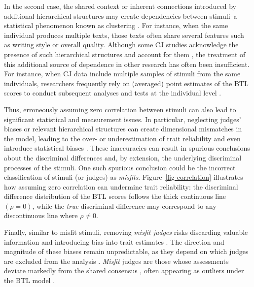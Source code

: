 \documentclass[
  authoryear,
  review,
  1p]{elsarticle}
\begin{document}
In the second case, the shared context or inherent connections
introduced by additional hierarchical structures may create dependencies
between stimuli--a statistical phenomenon known as clustering
\citep{Everitt_et_al_2010}. For instance, when the same individual
produces multiple texts, those texts often share several features such
as writing style or overall quality. Although some CJ studies
acknowledge the presence of such hierarchical structures and account for
them \citep[e.g.,][]{Boonen_et_al_2020}, the treatment of this
additional source of dependence in other research has often been
insufficient. For instance, when CJ data include multiple samples of
stimuli from the same individuals, researchers frequently rely on
(averaged) point estimates of the BTL scores to conduct subsequent
analyses and tests at the individual level
\citep{Bramley_et_al_2019, Bouwer_et_al_2023, vanDaal_et_al_2017, Jones_et_al_2019, Gijsen_et_al_2021}.

Thus, erroneously assuming zero correlation between stimuli can also
lead to significant statistical and measurement issues. In particular,
neglecting judges' biases or relevant hierarchical structures can create
dimensional mismatches in the model, leading to the over- or
underestimation of trait reliability
\citep{Ackerman_1989, Hoyle_et_al_2023} and even introduce statistical
biases \citep{Wu_et_al_2022}. These inaccuracies can result in spurious
conclusions about the discriminal differences \citep{McElreath_2020}
and, by extension, the underlying discriminal processes of the stimuli.
One such spurious conclusion could be the incorrect classification of
stimuli (or judges) as \emph{misfits}. Figure~\ref{fig-correlation}
illustrates how assuming zero correlation can undermine trait
reliability: the discriminal difference distribution of the BTL scores
follows the thick continuous line \((\rho = 0)\), while the \emph{true}
discriminal difference may correspond to any discontinuous line where
\(\rho \neq 0\).

Finally, similar to misfit stimuli, removing \emph{misfit judges} risks
discarding valuable information and introducing bias into trait
estimates \citep{Miller_2023}. The direction and magnitude of these
biases remain unpredictable, as they depend on which judges are excluded
from the analysis \citep{Zimmerman_1994, OHagan_2018, McElreath_2020}.
\emph{Misfit} judges are those whose assessments deviate markedly from
the shared consensus
\citep{Pollitt_2012a, Pollitt_2012b, vanDaal_et_al_2016, Goossens_et_al_2018, Wu_et_al_2022},
often appearing as outliers under the BTL model \citep{Wu_et_al_2022}.
\end{document}
